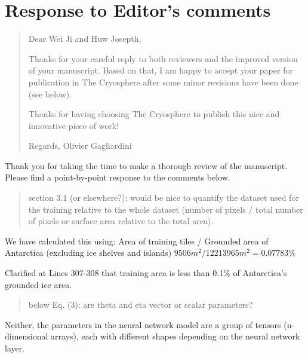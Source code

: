 \documentclass{article}
\begin{document}

\section*{Response to Editor's comments}


\begin{quote}
\color{blue}
Dear Wei Ji and Huw Josepth,

Thanks for your careful reply to both reviewers and the improved version of your manuscript. Based on that, I am happy to accept your paper for publication in The Cryosphere after some minor revisions have been done (see below).

Thanks for having choosing The Cryosphere to publish this nice and innovative piece of work!

Regards,
Olivier Gagliardini
\end{quote}

Thank you for taking the time to make a thorough review of the manuscript.
Please find a point-by-point response to the comments below.

\bigskip
{}

\begin{quote}
\color{blue}
section 3.1 (or elsewhere?): would be nice to quantify the dataset used for the training relative to the whole dataset (number of pixels / total number of pixels or surface area relative to the total area).
\end{quote}

We have calculated this using:
Area of training tiles / Grounded area of Antarctica (excluding ice shelves and islands)
$9506 m^2 / 12213965 m^2 = 0.07783\%$

{
  \color{ForestGreen}
   Clarified at Lines 307-308 that training area is less than 0.1\% of Antarctica's grounded ice area.
}

\begin{quote}
\color{blue}
below Eq. (3): are theta and eta vector or scalar parameters?
\end{quote}

Neither, the parameters in the neural network model are a group of tensors (n-dimensional arrays), each with different shapes depending on the neural network layer.
\end{document}
